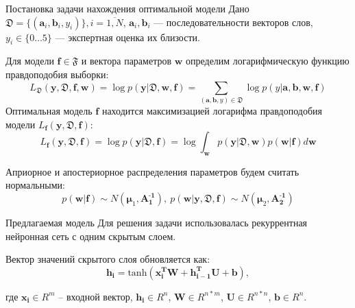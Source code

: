 \documentclass{beamer}
\newcommand{\PP}{p}
\newcommand{\DD}{{\mathfrak{D}}}
\newcommand{\FFF}{{\mathfrak{F}}}
\newcommand{\bw}{{\textbf{w}}}
\newcommand{\ba}{{\textbf{a}}}
\newcommand{\bb}{{\textbf{b}}}
\newcommand{\bbf}{{\textbf{f}}}
\newcommand{\by}{{\textbf{y}}}
\newcommand{\bAo}{\mathbf{A^\text{-1}_\text{1}}}
\newcommand{\bAt}{\mathbf{A^\text{-1}_\text{2}}}
\newcommand{\bmuo}{{\boldsymbol{\mu}_1}}
\newcommand{\bmut}{{\boldsymbol{\mu}_2}}
\begin{document}
\begin{frame}{Постановка задачи нахождения оптимальной модели}
Дано $\DD = \{(\ba_i,\bb_i,y_i)\}, i = \overline{1,N}$,
$\ba_i, \bb_i$ --- последовательности векторов слов, $y_i \in \{0\dots5\}$ --- экспертная оценка их близости. 

Для модели $\bbf \in \FFF$ и вектора параметров $\bw$ определим логарифмическую функцию правдоподобия выборки:
$$L_\DD(\by,\DD, \bbf,\bw) = \log\PP(\by|\DD,\bw,\bbf) = \sum_{(\ba,\bb,y)\in\DD} \log\PP(y|\ba,\bb,\bw,\bbf)$$
Оптимальная модель $\bbf$ находится максимизацией логарифма правдоподобия модели $L_\bbf(\by,\DD,\bbf)$:
$$L_\bbf(\by,\DD,\bbf) = \log \PP(\by|\DD,\bbf) = \log \int_{\bw}\PP(\by|\DD,\bw)\PP(\bw|\bbf)d\bw$$

Априорное и апостериорное распределения параметров будем считать нормальными:
$$\PP(\bw|\bbf) \sim N(\bmuo,\bAo), \ \PP(\bw|\by,\DD,\bbf) \sim N(\bmut,\bAt)$$

\end{frame}

\begin{frame}{Предлагаемая модель}
Для решения задачи использовалась рекуррентная нейронная сеть с одним скрытым слоем.


Вектор значений скрытого слоя обновляется как:
$$\mathbf{h_i} = \text{tanh}(\mathbf{x_i^TW} + \mathbf{h_{i-1}^TU} + \mathbf{b}),$$

где $\mathbf{x_i}\in R^m$ -- входной вектор, $\mathbf{h_i}\in R^n$, $\mathbf{W}\in R^{n*m}$, $\mathbf{U}\in R^{n*n}$, $\mathbf{b} \in R^n$.
\end{frame}
\end{document}
